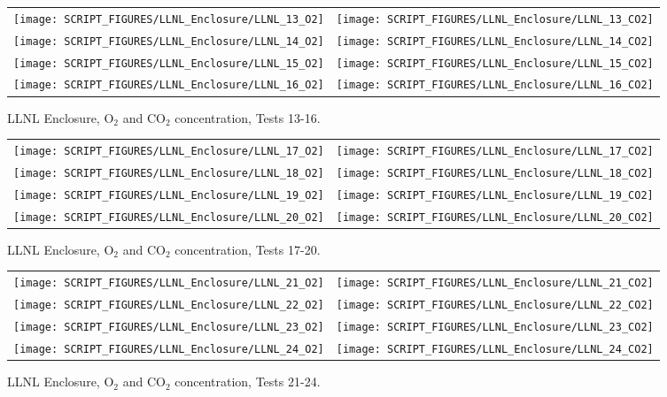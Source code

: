 \begin{figure}[p]
\begin{tabular*}{\textwidth}{l@{\extracolsep{\fill}}r}
\texttt{[image: SCRIPT\_FIGURES/LLNL\_Enclosure/LLNL\_13\_O2]} &
\texttt{[image: SCRIPT\_FIGURES/LLNL\_Enclosure/LLNL\_13\_CO2]} \\
\texttt{[image: SCRIPT\_FIGURES/LLNL\_Enclosure/LLNL\_14\_O2]} &
\texttt{[image: SCRIPT\_FIGURES/LLNL\_Enclosure/LLNL\_14\_CO2]} \\
\texttt{[image: SCRIPT\_FIGURES/LLNL\_Enclosure/LLNL\_15\_O2]} &
\texttt{[image: SCRIPT\_FIGURES/LLNL\_Enclosure/LLNL\_15\_CO2]} \\
\texttt{[image: SCRIPT\_FIGURES/LLNL\_Enclosure/LLNL\_16\_O2]} &
\texttt{[image: SCRIPT\_FIGURES/LLNL\_Enclosure/LLNL\_16\_CO2]}
\end{tabular*}
\caption{LLNL Enclosure, O$_2$ and CO$_2$ concentration, Tests 13-16.}
\label{LLNL_Gas_4}
\end{figure}

\begin{figure}[p]
\begin{tabular*}{\textwidth}{l@{\extracolsep{\fill}}r}
\texttt{[image: SCRIPT\_FIGURES/LLNL\_Enclosure/LLNL\_17\_O2]} &
\texttt{[image: SCRIPT\_FIGURES/LLNL\_Enclosure/LLNL\_17\_CO2]} \\
\texttt{[image: SCRIPT\_FIGURES/LLNL\_Enclosure/LLNL\_18\_O2]} &
\texttt{[image: SCRIPT\_FIGURES/LLNL\_Enclosure/LLNL\_18\_CO2]} \\
\texttt{[image: SCRIPT\_FIGURES/LLNL\_Enclosure/LLNL\_19\_O2]} &
\texttt{[image: SCRIPT\_FIGURES/LLNL\_Enclosure/LLNL\_19\_CO2]} \\
\texttt{[image: SCRIPT\_FIGURES/LLNL\_Enclosure/LLNL\_20\_O2]} &
\texttt{[image: SCRIPT\_FIGURES/LLNL\_Enclosure/LLNL\_20\_CO2]}
\end{tabular*}
\caption{LLNL Enclosure, O$_2$ and CO$_2$ concentration, Tests 17-20.}
\label{LLNL_Gas_5}
\end{figure}

\begin{figure}[p]
\begin{tabular*}{\textwidth}{l@{\extracolsep{\fill}}r}
\texttt{[image: SCRIPT\_FIGURES/LLNL\_Enclosure/LLNL\_21\_O2]} &
\texttt{[image: SCRIPT\_FIGURES/LLNL\_Enclosure/LLNL\_21\_CO2]} \\
\texttt{[image: SCRIPT\_FIGURES/LLNL\_Enclosure/LLNL\_22\_O2]} &
\texttt{[image: SCRIPT\_FIGURES/LLNL\_Enclosure/LLNL\_22\_CO2]} \\
\texttt{[image: SCRIPT\_FIGURES/LLNL\_Enclosure/LLNL\_23\_O2]} &
\texttt{[image: SCRIPT\_FIGURES/LLNL\_Enclosure/LLNL\_23\_CO2]} \\
\texttt{[image: SCRIPT\_FIGURES/LLNL\_Enclosure/LLNL\_24\_O2]} &
\texttt{[image: SCRIPT\_FIGURES/LLNL\_Enclosure/LLNL\_24\_CO2]}
\end{tabular*}
\caption{LLNL Enclosure, O$_2$ and CO$_2$ concentration, Tests 21-24.}
\label{LLNL_Gas_6}
\end{figure}

